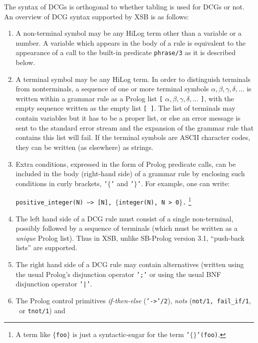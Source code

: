 The syntax of DCGs is orthogonal to whether tabling is used for DCGs
or not.  An overview of DCG syntax
 supported by XSB is as follows:
\begin{enumerate}
\item A non-terminal symbol may be any HiLog term other than a variable
      or a number. A variable which appears in the body of a rule is 
      equivalent to the appearance of a call to the built-in predicate 
      {\tt phrase/3} as it is described below.
\item A terminal symbol may be any HiLog term. In order to distinguish 
      terminals from nonterminals, a sequence of one or more terminal
      symbols   $\alpha, \beta, \gamma, \delta, \ldots$
      is written within a grammar rule as a Prolog list 
         {\tt [} $\alpha, \beta, \gamma, \delta, \ldots$ {\tt ]},
      with the empty sequence written as the empty list {\tt [\,]}.
      The list of terminals may contain variables but it has to be a 
      proper list, or else an error message is sent to the standard 
      error stream and the expansion of the grammar rule that contains 
      this list will fail. If the terminal symbols are ASCII character
      codes, they can be written (as elsewhere) as strings.
\item Extra conditions, expressed in the form of Prolog predicate calls, 
      can be included in the body (right-hand side) of a grammar rule by 
      enclosing such conditions in curly brackets, {\tt '$\{$'} and
      {\tt '$\}$'}.
      For example, one can write:
      \begin{center}
                {\tt positive\_integer(N) --> [N], $\{$integer(N), N > 0$\}$.}
                \footnote{A term like {\tt $\{$foo$\}$} is just a
			  syntactic-sugar for the term {\tt '$\{\}$'(foo)}.}
      \end{center}
\item The left hand side of a DCG rule must consist of a single non-terminal,
      possibly followed by a sequence of terminals (which must be written as
      a {\em unique} Prolog list). Thus in XSB, unlike SB-Prolog 
      version 3.1, ``push-back lists'' are supported.
\item The right hand side of a DCG rule may contain alternatives (written 
      using the usual Prolog's disjunction operator {\tt ';'} or 
      using the usual BNF disjunction operator {\tt '|'}. 
\item The Prolog control primitives {\em if-then-else} ({\tt '->'/2}),
      {\em nots} ({\tt not/1, fail\_if/1}, \not\ or {\tt tnot/1}) and 

\end{enumerate}
